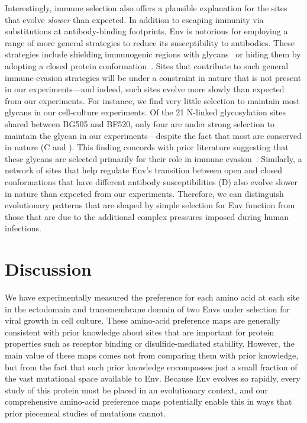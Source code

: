 \documentclass[9pt]{elife}
\begin{document}
Interestingly, immune selection also offers a plausible explanation for the sites that evolve \emph{slower} than expected.
In addition to escaping immunity via substitutions at antibody-binding footprints, Env is notorious for employing a range of more general strategies to reduce its susceptibility to antibodies.
These strategies include shielding immunogenic regions with glycans~\citep{wei2003antibody,stewart2016trimeric,gristick2016natively} or hiding them by adopting a closed protein conformation~\citep{kwong2002hiv,guttman2015antibody,ozorowski2017open}.
Sites that contribute to such general immune-evasion strategies will be under a constraint in nature that is not present in our experiments---and indeed, such sites evolve more slowly than expected from our experiments.
For instance, we find very little selection to maintain most glycans in our cell-culture experiments.
Of the 21 N-linked glycosylation sites shared between BG505 and BF520, only four are under strong selection to maintain the glycan in our experiments---despite the fact that most are conserved in nature (C and ). 
This finding concords with prior literature suggesting that these glycans are selected primarily for their role in immune evasion~\citep{pugach2004prolonged,wang2013systematic,rathore2017glycosylation}. 
Similarly, a network of sites that help regulate Env's transition between open and closed conformations that have different antibody susceptibilities (D) also evolve slower in nature than expected from our experiments.
Therefore, we can distinguish evolutionary patterns that are shaped by simple selection for Env function from those that are due to the additional complex pressures imposed during human infections. 

\section{Discussion}
We have experimentally measured the preference for each amino acid at each site in the ectodomain and transmembrane domain of two Envs under selection for viral growth in cell culture.
These amino-acid preference maps are generally consistent with prior knowledge about sites that are important for protein properties such as receptor binding or disulfide-mediated stability.
However, the main value of these maps comes not from comparing them with prior knowledge, but from the fact that such prior knowledge encompasses just a small fraction of the vast mutational space available to Env.
Because Env evolves so rapidly, every study of this protein must be placed in an evolutionary context, and our comprehensive amino-acid preference maps potentially enable this in ways that prior piecemeal studies of mutations cannot.
\end{document}
